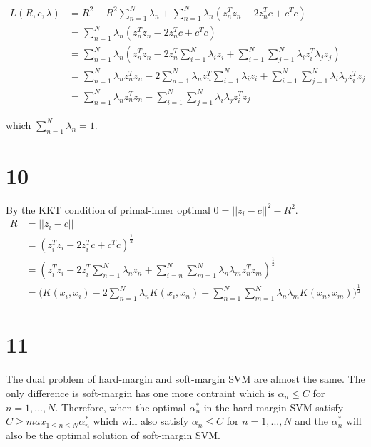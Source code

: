 \documentclass[12pt]{article}
\begin{document}
\begin{equation*}
\begin{split}
L(R, c, \lambda) 
&= R^2 - R^2\sum_{n=1}^N \lambda_n + \sum_{n=1}^N \lambda_n (z_n^Tz_n - 2z_n^Tc + c^Tc) \\
&= \sum_{n=1}^N \lambda_n (z_n^Tz_n - 2z_n^Tc + c^Tc) \\
&= \sum_{n=1}^N \lambda_n (z_n^Tz_n - 2z_n^T \sum_{i=1}^N \lambda_i z_i + \sum_{i=1}^N \sum_{j=1}^N \lambda_i z_i^T  \lambda_j z_j) \\
&= \sum_{n=1}^N \lambda_n z_n^Tz_n - 2 \sum_{n=1}^N \lambda_n z_n^T \sum_{i=1}^N \lambda_i z_i + \sum_{i=1}^N \sum_{j=1}^N \lambda_i \lambda_j z_i^T z_j \\
&= \sum_{n=1}^N \lambda_n z_n^Tz_n - \sum_{i=1}^N \sum_{j=1}^N \lambda_i \lambda_j z_i^T z_j 
\end{split}
\end{equation*}

which $\sum_{n=1}^N \lambda_n = 1$.

\section*{10}

By the KKT condition of primal-inner optimal $0 = ||z_i - c||^2 - R^2$.
\begin{equation*}
\begin{split}
    R &= ||z_i - c|| \\
    &= (z_i^Tz_i - 2z_i^Tc + c^Tc)^{\frac{1}{2}} \\
    &= (z_i^Tz_i - 2z_i^T \sum_{n=1}^N \lambda_n z_n + \sum_{i=n}^N \sum_{m=1}^N \lambda_n \lambda_m z_n^T z_m)^{\frac{1}{2}} \\
    &= \Big(K(x_i, x_i) - 2 \sum_{n=1}^N \lambda_n K(x_i, x_n) + \sum_{n=1}^N \sum_{m=1}^N \lambda_n \lambda_m K(x_n, x_m)\Big)^{\frac{1}{2}} 
\end{split}
\end{equation*}

\section*{11}
The dual problem of hard-margin and soft-margin SVM are almost the same.
The only difference is soft-margin has one more contraint which is $\alpha_n \leq C$ for $n=1,...,N$.
Therefore, when the optimal $\alpha_n^*$ in the hard-margin SVM satisfy $C \geq max_{1\leq n \leq N} \alpha_n^*$ which will also satisfy $\alpha_n \leq C$ for $n=1,...,N$
and the $\alpha_n^*$ will also be the optimal solution of soft-margin SVM.
\end{document}
